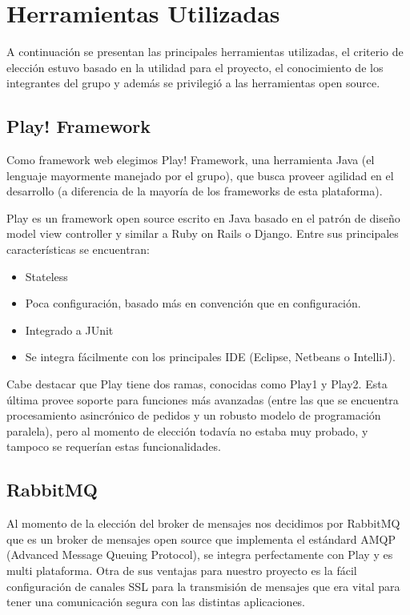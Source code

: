 \section{Herramientas Utilizadas}

A continuación se presentan las principales herramientas utilizadas, el criterio de elección estuvo basado en la utilidad para el proyecto, el conocimiento de los integrantes del grupo y además se privilegió a las herramientas open source.

\subsection{Play! Framework}

Como framework web elegimos Play! Framework, una herramienta Java (el lenguaje mayormente manejado por el grupo),
que busca proveer agilidad en el desarrollo (a diferencia de la mayoría de los frameworks de esta plataforma).

Play es un framework open source escrito en Java basado en el patrón de diseño model view controller y similar a Ruby on Rails o Django. Entre sus principales características se encuentran:

\begin{itemize}
\item Stateless
\item Poca configuración, basado más en convención que en configuración.
\item Integrado a JUnit	
\item Se integra fácilmente con los principales IDE (Eclipse, Netbeans o IntelliJ).
\end{itemize}

Cabe destacar que Play tiene dos ramas, conocidas como Play1 y Play2. Esta última provee soporte para funciones
más avanzadas (entre las que se encuentra procesamiento asincrónico de pedidos y un robusto modelo de programación 
paralela), pero al momento de elección todavía no estaba muy probado, y tampoco se requerían estas funcionalidades.

\subsection{RabbitMQ}

Al momento de la elección del broker de mensajes nos decidimos por RabbitMQ que es un broker de mensajes open source que implementa el estándard AMQP (Advanced Message Queuing Protocol), se integra perfectamente con Play y es multi plataforma. 
Otra de sus ventajas para nuestro proyecto es la fácil configuración de canales SSL para la transmisión de mensajes que era vital para tener una comunicación segura con las distintas aplicaciones.
 
